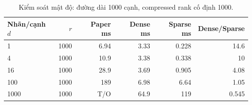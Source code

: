 \begin{table}[htbp]
\centering
\small
\setlength{\tabcolsep}{4pt}
\caption{Kiểm soát mật độ: đường dài 1000 cạnh, compressed rank cố định 1000.}
\label{tab:density-control}
\begin{tabular}{lrrrrr}
\toprule
Nhãn/cạnh $d$ & $r$ & Paper ms & Dense ms & Sparse ms & Dense/Sparse \\
\midrule
1 & 1000 & 6.94 & 3.33 & 0.228 & 14.6 \\
4 & 1000 & 10.9 & 3.38 & 0.338 & 10 \\
16 & 1000 & 28.9 & 3.69 & 0.905 & 4.08 \\
100 & 1000 & 189 & 6.98 & 6.64 & 1.05 \\
1000 & 1000 & T/O & 64.9 & 119 & 0.545 \\
\bottomrule
\end{tabular}
\end{table}
